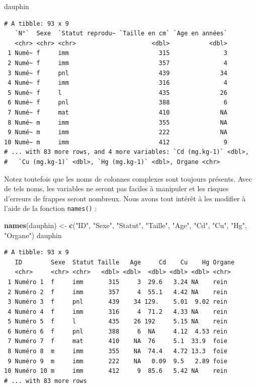 \documentclass[
  a4paper,
]{article}
\newenvironment{Shaded}{\begin{snugshade}}{\end{snugshade}}
\newcommand{\KeywordTok}[1]{\textcolor[rgb]{0.12,0.11,0.11}{\textbf{#1}}}
\newcommand{\NormalTok}[1]{\textcolor[rgb]{0.12,0.11,0.11}{#1}}
\newcommand{\StringTok}[1]{\textcolor[rgb]{0.75,0.01,0.01}{#1}}
\begin{document}
\begin{Shaded}
\begin{Highlighting}[]
\NormalTok{dauphin}
\end{Highlighting}
\end{Shaded}

\begin{verbatim}
# A tibble: 93 x 9
   `N°`  Sexe  `Statut reprodu~ `Taille en cm` `Age en années`
   <chr> <chr> <chr>                     <dbl>           <dbl>
 1 Numé~ f     imm                         315               3
 2 Numé~ f     imm                         357               4
 3 Numé~ f     pnl                         439              34
 4 Numé~ f     imm                         316               4
 5 Numé~ f     l                           435              26
 6 Numé~ f     pnl                         388               6
 7 Numé~ f     mat                         410              NA
 8 Numé~ m     imm                         355              NA
 9 Numé~ m     imm                         222              NA
10 Numé~ m     imm                         412               9
# ... with 83 more rows, and 4 more variables: `Cd (mg.kg-1)` <dbl>,
#   `Cu (mg.kg-1)` <dbl>, `Hg (mg.kg-1)` <dbl>, Organe <chr>
\end{verbatim}

Notez toutefois que les noms de colonnes complexes sont toujours présents. Avec de tels noms, les variables ne seront pas faciles à manipuler et les risques d'erreurs de frappes seront nombreux. Nous avons tout intérêt à les modifier à l'aide de la fonction \texttt{names()} :

\begin{Shaded}
\begin{Highlighting}[]
\KeywordTok{names}\NormalTok{(dauphin) <-}\StringTok{ }\KeywordTok{c}\NormalTok{(}\StringTok{"ID"}\NormalTok{, }\StringTok{"Sexe"}\NormalTok{, }\StringTok{"Statut"}\NormalTok{, }\StringTok{"Taille"}\NormalTok{, }\StringTok{"Age"}\NormalTok{, }\StringTok{"Cd"}\NormalTok{, }\StringTok{"Cu"}\NormalTok{, }
    \StringTok{"Hg"}\NormalTok{, }\StringTok{"Organe"}\NormalTok{)}
\NormalTok{dauphin}
\end{Highlighting}
\end{Shaded}

\begin{verbatim}
# A tibble: 93 x 9
   ID        Sexe  Statut Taille   Age     Cd    Cu    Hg Organe
   <chr>     <chr> <chr>   <dbl> <dbl>  <dbl> <dbl> <dbl> <chr> 
 1 Numéro 1  f     imm       315     3  29.6   3.24 NA    rein  
 2 Numéro 2  f     imm       357     4  55.1   4.42 NA    rein  
 3 Numéro 3  f     pnl       439    34 129.    5.01  9.02 rein  
 4 Numéro 4  f     imm       316     4  71.2   4.33 NA    rein  
 5 Numéro 5  f     l         435    26 192     5.15 NA    rein  
 6 Numéro 6  f     pnl       388     6  NA     4.12  4.53 rein  
 7 Numéro 7  f     mat       410    NA  76     5.1  33.9  foie  
 8 Numéro 8  m     imm       355    NA  74.4   4.72 13.3  foie  
 9 Numéro 9  m     imm       222    NA   0.09  9.5   2.89 foie  
10 Numéro 10 m     imm       412     9  85.6   5.42 NA    rein  
# ... with 83 more rows
\end{verbatim}
\end{document}

